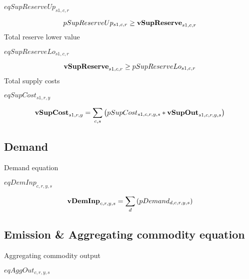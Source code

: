 \documentclass{article}
\begin{document}
$eqSupReserveUp_{s1,c,r}$





\begin{dmath} 
pSupReserveUp_{s1,c,r}  \ge  {\bf vSupReserve}_{s1,c,r}
\end{dmath} 
Total reserve lower value







$eqSupReserveLo_{s1,c,r}$





\begin{dmath} 
{\bf vSupReserve}_{s1,c,r}  \ge  pSupReserveLo_{s1,c,r}
\end{dmath} 
Total supply costs







$eqSupCost_{s1,r,y}$





\begin{dmath} 
{\bf vSupCost}_{s1,r,y}  =  \sum_{c,s}{\left(pSupCost_{s1,c,r,y,s}*{\bf vSupOut}_{s1,c,r,y,s}\right)}
\end{dmath} 
\subsection*{Demand}
Demand equation







$eqDemInp_{c,r,y,s}$





\begin{dmath} 
{\bf vDemInp}_{c,r,y,s}  =  \sum_{d}{\left(pDemand_{d,c,r,y,s}\right)}
\end{dmath} 
\subsection*{Emission \& Aggregating commodity equation}
Aggregating commodity output







$eqAggOut_{c,r,y,s}$
\end{document}
